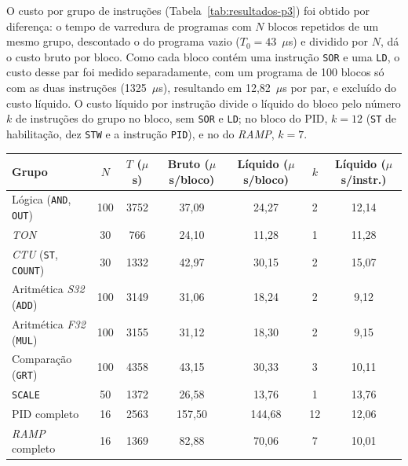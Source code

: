 O custo por grupo de instruções (Tabela~\ref{tab:resultados-p3}) foi obtido por diferença: o tempo de varredura de programas com $N$ blocos repetidos de um mesmo grupo, descontado o do programa vazio ($T_0 = 43$~$\mu$s) e dividido por $N$, dá o custo bruto por bloco.
Como cada bloco contém uma instrução \texttt{SOR} e uma \texttt{LD}, o custo desse par foi medido separadamente, com um programa de 100 blocos só com as duas instruções (1325~$\mu$s), resultando em 12,82~$\mu$s por par, e excluído do custo líquido.
O custo líquido por instrução divide o líquido do bloco pelo número $k$ de instruções do grupo no bloco, sem \texttt{SOR} e \texttt{LD}; no bloco do PID, $k = 12$ (\texttt{ST} de habilitação, dez \texttt{STW} e a instrução \texttt{PID}), e no do \textit{RAMP}, $k = 7$.

\begin{tabelafixa}
    \centering
    \label{tab:resultados-p3}
    \small
    \begin{tabular}{p{3.0cm}cccccc}
        \hline
        Grupo & $N$ & $T$ ($\mu$s) & Bruto ($\mu$s/bloco) & Líquido ($\mu$s/bloco) & $k$ & Líquido ($\mu$s/instr.) \\
        \hline
        Lógica (\texttt{AND}, \texttt{OUT}) & 100 & 3752 & 37,09 & 24,27 & 2 & 12,14 \\
        \textit{TON} & 30 & 766 & 24,10 & 11,28 & 1 & 11,28 \\
        \textit{CTU} (\texttt{ST}, \texttt{COUNT}) & 30 & 1332 & 42,97 & 30,15 & 2 & 15,07 \\
        Aritmética \textit{S32} (\texttt{ADD}) & 100 & 3149 & 31,06 & 18,24 & 2 & 9,12 \\
        Aritmética \textit{F32} (\texttt{MUL}) & 100 & 3155 & 31,12 & 18,30 & 2 & 9,15 \\
        Comparação (\texttt{GRT}) & 100 & 4358 & 43,15 & 30,33 & 3 & 10,11 \\
        \texttt{SCALE} & 50 & 1372 & 26,58 & 13,76 & 1 & 13,76 \\
        PID completo & 16 & 2563 & 157,50 & 144,68 & 12 & 12,06 \\
        \textit{RAMP} completo & 16 & 1369 & 82,88 & 70,06 & 7 & 10,01 \\
        \hline
    \end{tabular}
    \vspace{14pt}
\end{tabelafixa}

